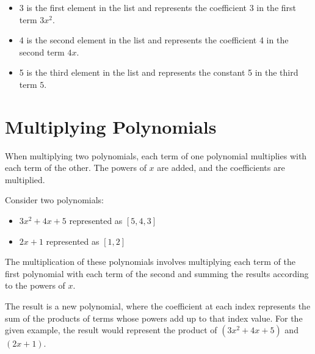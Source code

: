 \documentclass{article}
\begin{document}
\begin{itemize}
  \item 3 is the first element in the list and represents the coefficient 3 in the first term \( 3x^2 \).
  \item 4 is the second element in the list and represents the coefficient 4 in the second term \( 4x \).
  \item 5 is the third element in the list and represents the constant 5 in the third term \( 5 \).
\end{itemize}

\section*{Multiplying Polynomials}

When multiplying two polynomials, each term of one polynomial multiplies with each term of the other. The powers of \( x \) are added, and the coefficients are multiplied.

Consider two polynomials:
\begin{itemize}
  \item \( 3x^2 + 4x + 5 \) represented as \([5, 4, 3]\)
  \item \( 2x + 1 \) represented as \([1, 2]\)
\end{itemize}

The multiplication of these polynomials involves multiplying each term of the first polynomial with each term of the second and summing the results according to the powers of \( x \).

The result is a new polynomial, where the coefficient at each index represents the sum of the products of terms whose powers add up to that index value. For the given example, the result would represent the product of \( (3x^2 + 4x + 5) \) and \( (2x + 1) \).
\end{document}
